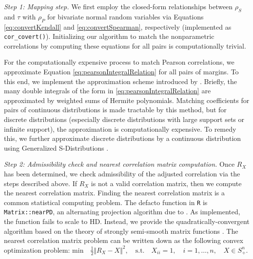 \documentclass[
]{jss}
\begin{document}
\emph{Step 1: Mapping step.} We first employ the closed-form relationships between \(\rho_S\) and \(\tau\) with \(\rho_P\) for bivariate normal random variables via Equations \eqref{eq:convertKendall} and \eqref{eq:convertSpearman}, respectively (implemented as \texttt{cor\_covert()}). Initializing our algorithm to match the nonparametric correlations by computing these equations for all pairs is computationally trivial.

For the computationally expensive process to match Pearson correlations, we approximate Equation \eqref{eq:pearsonIntegralRelation} for all pairs of margins. To this end, we implement the approximation scheme introduced by \citep{XZ19}. Briefly, the many double integrals of the form in \eqref{eq:pearsonIntegralRelation} are approximated by weighted sums of Hermite polynomials. Matching coefficients for pairs of continuous distributions is made tractable by this method, but for discrete distributions (especially discrete distributions with large support sets or infinite support), the approximation is computationally expensive. To remedy this, we further approximate discrete distributions by a continuous distribution using Generalized S-Distributions \citep{muino2006gs}.

\emph{Step 2: Admissibility check and nearest correlation matrix computation.} Once \(R_X\) has been determined, we check admissibility of the adjusted correlation via the steps described above. If \(R_X\) is not a valid correlation matrix, then we compute the nearest correlation matrix. Finding the nearest correlation matrix is a common statistical computing problem. The defacto function in \texttt{R} is \texttt{Matrix::nearPD}, an alternating projection algorithm due to \citet{higham2002computing}. As implemented, the function fails to scale to HD. Instead, we provide the quadratically-convergent algorithm based on the theory of strongly semi-smooth matrix functions \citep{qi2006quadratically}. The nearest correlation matrix problem can be written down as the following convex optimization problem: \(\mathrm{min} \quad \frac{1}{2} \Vert R_X - X \Vert^2, \quad \mathrm{s.t.} \quad X_{ii} = 1, \quad i = 1, \ldots , n, \quad X \in S_{+}^{n}\).
\end{document}
